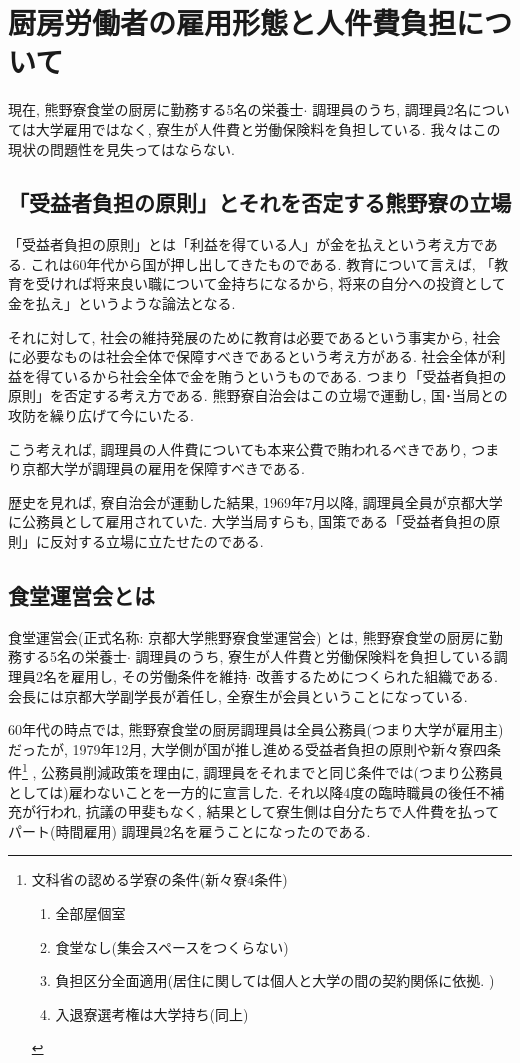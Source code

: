 \documentclass[10pt,b5jsbook,dvips,dvipdfmx,openany]{jsbook}
\theoremstyle{definition}
\begin{document}
	\section{厨房労働者の雇用形態と人件費負担について}

	現在, 熊野寮食堂の厨房に勤務する5名の栄養士$ \cdot $ 調理員のうち, 調理員2名については大学雇用ではなく, 寮生が人件費と労働保険料を負担している. 我々はこの現状の問題性を見失ってはならない.

		\subsection{「受益者負担の原則」とそれを否定する熊野寮の立場}

	「受益者負担の原則」とは「利益を得ている人」が金を払えという考え方である. これは60年代から国が押し出してきたものである. 教育について言えば, 「教育を受ければ将来良い職について金持ちになるから, 将来の自分への投資として金を払え」というような論法となる.

	それに対して, 社会の維持発展のために教育は必要であるという事実から, 社会に必要なものは社会全体で保障すべきであるという考え方がある. 社会全体が利益を得ているから社会全体で金を賄うというものである. つまり「受益者負担の原則」を否定する考え方である. 熊野寮自治会はこの立場で運動し, 国･当局との攻防を繰り広げて今にいたる.

	こう考えれば, 調理員の人件費についても本来公費で賄われるべきであり, つまり京都大学が調理員の雇用を保障すべきである.

	歴史を見れば, 寮自治会が運動した結果, 1969年7月以降, 調理員全員が京都大学に公務員として雇用されていた. 大学当局すらも, 国策である「受益者負担の原則」に反対する立場に立たせたのである.


		\subsection{食堂運営会とは}

		食堂運営会(正式名称: 京都大学熊野寮食堂運営会) とは, 熊野寮食堂の厨房に勤務する5名の栄養士$ \cdot $ 調理員のうち, 寮生が人件費と労働保険料を負担している調理員2名を雇用し, その労働条件を維持$ \cdot $ 改善するためにつくられた組織である. 会長には京都大学副学長が着任し, 全寮生が会員ということになっている.

		60年代の時点では, 熊野寮食堂の厨房調理員は全員公務員(つまり大学が雇用主) だったが, 1979年12月, 大学側が国が推し進める受益者負担の原則や新々寮四条件\footnote{文科省の認める学寮の条件(新々寮4条件)
\begin{enumerate}
\item 全部屋個室
\item 食堂なし(集会スペースをつくらない)
\item 負担区分全面適用(居住に関しては個人と大学の間の契約関係に依拠. )
\item 入退寮選考権は大学持ち(同上)
\end{enumerate}} , 公務員削減政策を理由に, 調理員をそれまでと同じ条件では(つまり公務員としては)雇わないことを一方的に宣言した. それ以降4度の臨時職員の後任不補充が行われ, 抗議の甲斐もなく, 結果として寮生側は自分たちで人件費を払ってパート(時間雇用) 調理員2名を雇うことになったのである.
\end{document}
